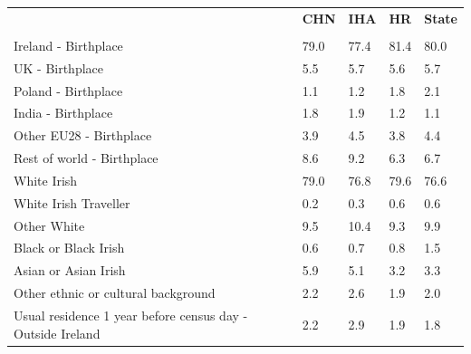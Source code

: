 \documentclass{article}
\begin{document}
\pagebreak
\begin{table}[h]	
\centering
		\begin{tabular}{KTTTT}
  \hline
& \textbf{CHN} & \textbf{IHA} & \textbf{HR}& \textbf{State}\\ 
  \hline
    \\ 
    \hline
Ireland - Birthplace & 79.0& 77.4& 81.4& 80.0\\
UK - Birthplace & 5.5& 5.7& 5.6& 5.7\\
Poland - Birthplace & 1.1& 1.2& 1.8& 2.1\\
India - Birthplace & 1.8& 1.9& 1.2& 1.1\\
Other EU28 - Birthplace & 3.9& 4.5& 3.8& 4.4\\
Rest of world - Birthplace & 8.6& 9.2& 6.3& 6.7\\
    \hline
White Irish & 79.0& 76.8& 79.6& 76.6\\
White Irish Traveller & 0.2& 0.3& 0.6& 0.6\\
Other White &  9.5& 10.4&  9.3&  9.9\\
Black or Black Irish & 0.6& 0.7& 0.8& 1.5\\
Asian or Asian Irish & 5.9& 5.1& 3.2& 3.3\\
Other ethnic or cultural background & 2.2& 2.6& 1.9& 2.0\\
    \hline
Usual residence 1 year before census day - Outside Ireland & 2.2& 2.9& 1.9& 1.8\\


\end{tabular}
\end{table}
\end{document}
